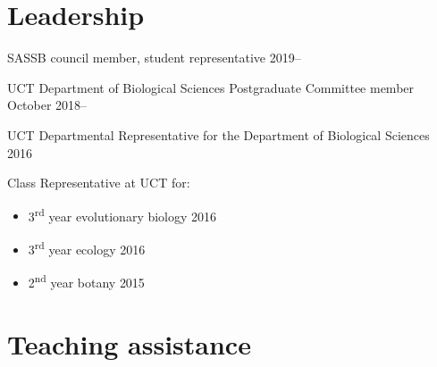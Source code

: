 \documentclass[10pt]{article}
\begin{document}
\section*{Leadership} %

SASSB council member, student representative              \hfill {\small 2019--}

UCT Department of Biological Sciences Postgraduate Committee member
                                                 \hfill {\small  October 2018--}

UCT Departmental Representative for the Department of Biological Sciences
                                                            \hfill {\small 2016}

Class Representative at UCT for:

\begin{itemize}[noitemsep, nolistsep]
  \item 3\textsuperscript{rd} year evolutionary biology     \hfill {\small 2016}
  \item 3\textsuperscript{rd} year ecology                  \hfill {\small 2016}
  \item 2\textsuperscript{nd} year botany                   \hfill {\small 2015}
\end{itemize}

\section*{Teaching assistance} %

\end{document}
